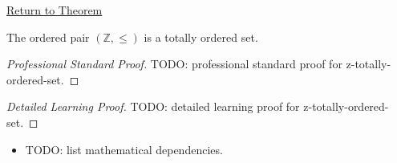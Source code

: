 \newpage
{}
\label{prf:z-totally-ordered-set}

\begin{remark*}[Return]
\hyperref[thm:z-totally-ordered-set]{Return to Theorem}
\end{remark*}

\begin{theorem*}
The ordered pair $(\mathbb{Z},\le)$ is a totally ordered set.
\end{theorem*}

\begin{proof}[Professional Standard Proof]
\LRAProofBodyStart
TODO: professional standard proof for z-totally-ordered-set.
\end{proof}

\begin{proof}[Detailed Learning Proof]
\LRAProofBodyStart
TODO: detailed learning proof for z-totally-ordered-set.
\end{proof}

\begin{remark*}
\end{remark*}

\begin{dependencies}
\begin{itemize}
  \item TODO: list mathematical dependencies.
\end{itemize}
\end{dependencies}

\clearpage
